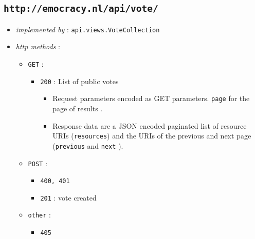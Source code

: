 \documentclass[a4paper]{report}
\begin{document}
\subsection{\texttt{http://emocracy.nl/api/vote/}}
\begin{itemize}
    \item{\textsl{implemented by} : \texttt{api.views.VoteCollection}}
    \item{\textsl{http methods} :
        \begin{itemize}
            \item{\texttt{GET} :
                \begin{itemize}
                    \item{\texttt{200} : List of public votes
                    \begin{itemize}
                        \item{Request parameters encoded as GET parameters. 
                        \texttt{page} for the page of results .}
                        \item{Response data are a JSON encoded paginated list of 
                        resource URIs (\texttt{resources}) and the URIs of the 
                        previous and next page (\texttt{previous} and \texttt{next}
                        ).}
                    \end{itemize}
                    }
                \end{itemize}
            }
            \item{\texttt{POST} :
                \begin{itemize}
                    \item{\texttt{400, 401}}
                    \item{\texttt{201} : vote created}
                \end{itemize}
            }
            
            \item{\texttt{other} :
                \begin{itemize}
                    \item{\texttt{405}}
                \end{itemize}
            }
        \end{itemize}
    }
\end{itemize}
\end{document}
